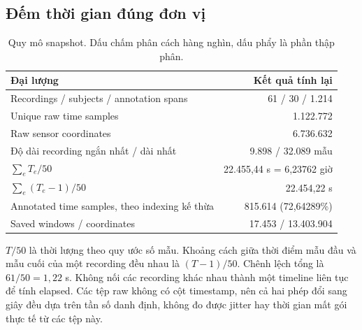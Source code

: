 \documentclass[11pt,a4paper]{article}
\theoremstyle{definition}
\begin{document}
\subsection{Đếm thời gian đúng đơn vị}
\begin{table}[htbp]\centering
\begin{tabular}{@{}lr@{}}\toprule
Đại lượng & Kết quả tính lại\\\midrule
Recordings / subjects / annotation spans & 61 / 30 / 1.214\\
Unique raw time samples & 1.122.772\\
Raw sensor coordinates & 6.736.632\\
Độ dài recording ngắn nhất / dài nhất & 9.898 / 32.089 mẫu\\
$\sum_e T_e/50$ & 22.455,44 s = 6,23762 giờ\\
$\sum_e(T_e-1)/50$ & 22.454,22 s\\
Annotated time samples, theo indexing kế thừa & 815.614 (72,64289\%)\\
Saved windows / coordinates & 17.453 / 13.403.904\\\bottomrule
\end{tabular}
\caption{Quy mô snapshot. Dấu chấm phân cách hàng nghìn, dấu phẩy là phần thập phân.}
\end{table}

$T/50$ là thời lượng theo quy ước số mẫu. Khoảng cách giữa thời điểm mẫu đầu
và mẫu cuối của một recording đều nhau là $(T-1)/50$. Chênh lệch tổng là
$61/50=1,22$ s. Không nối các recording khác nhau thành một timeline liên
tục để tính elapsed. Các tệp raw không có cột timestamp, nên cả hai phép
đổi sang giây đều dựa trên tần số danh định, không đo được jitter hay thời
gian mất gói thực tế từ các tệp này.
\end{document}
